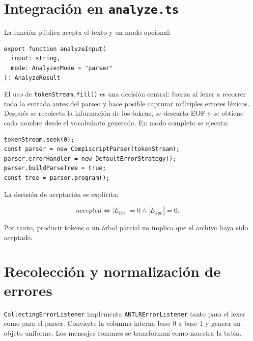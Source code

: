 \documentclass[12pt,letterpaper,oneside]{report}
\newcommand{\archivo}[1]{\texttt{#1}}
\begin{document}
\vspace{5cm}

\section{Integración en \archivo{analyze.ts}}

La función pública acepta el texto y un modo opcional:

\begin{verbatim}
export function analyzeInput(
  input: string,
  mode: AnalyzerMode = "parser"
): AnalyzeResult
\end{verbatim}

El uso de \archivo{tokenStream.fill()} es una decisión central: fuerza al lexer a
recorrer toda la entrada antes del parseo y hace posible capturar múltiples errores
léxicos. Después se recolecta la información de los tokens, se descarta EOF y se
obtiene cada nombre desde el vocabulario generado. En modo completo se ejecuta:

\begin{verbatim}
tokenStream.seek(0);
const parser = new CompiscriptParser(tokenStream);
parser.errorHandler = new DefaultErrorStrategy();
parser.buildParseTree = true;
const tree = parser.program();
\end{verbatim}

La decisión de aceptación es explícita:

\[
  accepted \iff |E_{lex}|=0 \land |E_{syn}|=0.
\]

Por tanto, producir tokens o un árbol parcial no implica que el archivo haya sido
aceptado.

\vspace{10cm}

\section{Recolección y normalización de errores}

\archivo{CollectingErrorListener} implementa \archivo{ANTLRErrorListener} tanto para
el lexer como para el parser. Convierte la columna interna base 0 a base 1 y genera un
objeto uniforme. Los mensajes comunes se transforman como muestra la tabla.
\end{document}
